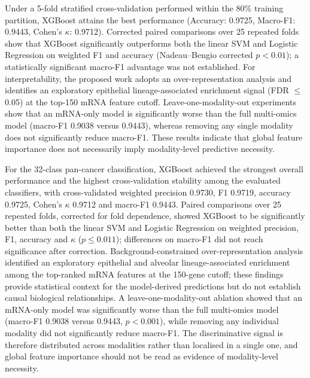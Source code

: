Under a 5-fold stratified cross-validation performed within the 80\% training
partition, XGBoost attains the best performance (Accuracy: 0.9725, Macro-F1:
0.9443, Cohen's $\kappa$: 0.9712). Corrected paired comparisons over 25
repeated folds show that XGBoost significantly outperforms both the linear SVM
and Logistic Regression on weighted F1 and accuracy (Nadeau--Bengio corrected
$p < 0.01$); a statistically significant macro-F1 advantage was not established.
For interpretability, the proposed work adopts an over-representation analysis
and identifies an exploratory epithelial lineage-associated enrichment signal
(FDR $\leq$ 0.05) at the top-150 mRNA feature cutoff. Leave-one-modality-out
experiments show that an mRNA-only model is significantly worse than the full
multi-omics model (macro-F1 0.9038 versus 0.9443), whereas removing any single
modality does not significantly reduce macro-F1. These results indicate that
global feature importance does not necessarily imply modality-level predictive
necessity.


For the 32-class pan-cancer classification, XGBoost achieved the strongest
overall performance and the highest cross-validation stability among the
evaluated classifiers, with cross-validated weighted precision 0.9730, F1 0.9719,
accuracy 0.9725, Cohen's $\kappa$ 0.9712 and macro-F1 0.9443. Paired comparisons
over 25 repeated folds, corrected for fold dependence, showed XGBoost to be
significantly better than both the linear SVM and Logistic Regression on
weighted precision, F1, accuracy and $\kappa$ ($p \leq 0.011$); differences on
macro-F1 did not reach significance after correction. Background-constrained
over-representation analysis identified an exploratory epithelial and alveolar
lineage-associated enrichment among the top-ranked mRNA features at the
150-gene cutoff; these findings provide statistical context for the model-derived
predictions but do not establish causal biological relationships. A
leave-one-modality-out ablation showed that an mRNA-only model was significantly
worse than the full multi-omics model (macro-F1 0.9038 versus 0.9443,
$p < 0.001$), while removing any individual modality did not significantly
reduce macro-F1. The discriminative signal is therefore distributed across
modalities rather than localised in a single one, and global feature importance
should not be read as evidence of modality-level necessity.


